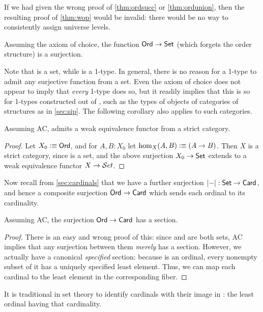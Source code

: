 \begin{rmk}
  If we had given the wrong proof of \autoref{thm:ordsucc} or \autoref{thm:ordunion}, then the resulting proof of \autoref{thm:wop} would be invalid: there would be no way to consistently assign universe levels.
\end{rmk}

\begin{cor}
  Assuming the axiom of choice, the function $\mathsf{Ord}\to\mathsf{Set}$ (which forgets the order structure) is a surjection.
\end{cor}

Note that \ord is a set, while \set is a 1-type.
In general, there is no reason for a 1-type to admit any surjective function from a set.
Even the axiom of choice does not appear to imply that \emph{every} 1-type does so, but it readily implies that this is so for 1-types constructed out of \set, such as the types of objects of categories of structures as in \autoref{sec:sip}.
The following corollary also applies to such categories.

\begin{cor}
  Assuming AC, \uset admits a weak equivalence functor from a strict category.
\end{cor}
\begin{proof}
  Let $X_0\vcentcolon\equiv \mathsf{Ord}$, and for $A,B:X_0$ let $\hom_X(A,B) \vcentcolon\equiv (A\to B)$.
  Then $X$ is a strict category, since \ord is a set, and the above surjection $X_0 \to \mathsf{Set}$ extends to a weak equivalence functor $X\to \mathcal{S}et$.
\end{proof}

Now recall from \autoref{sec:cardinals} that we have a further surjection $\left|-\right|:\mathsf{Set}\to\mathsf{Card}$, and hence a composite surjection $\mathsf{Ord}\to\mathsf{Card}$ which sends each ordinal to its cardinality.

\begin{thm}
  Assuming AC, the surjection $\mathsf{Ord}\to\mathsf{Card}$ has a section.
\end{thm}
\begin{proof}
  There is an easy and wrong proof of this: since \ord and \card are both sets, AC implies that any surjection between them \emph{merely} has a section.
  However, we actually have a canonical \emph{specified} section: because \ord is an ordinal, every nonempty subset of it has a uniquely specified least element.
  Thus, we can map each cardinal to the least element in the corresponding fiber.
\end{proof}

It is traditional in set theory to identify cardinals with their image in \ord: the least ordinal having that cardinality.

